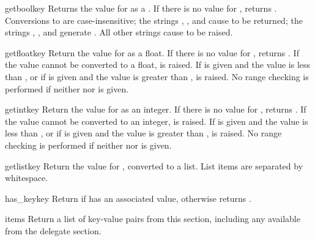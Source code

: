 \documentclass{howto}
\begin{document}
\begin{methoddesc}[Configuration]{getbool}{key}
  Returns the value for  as a .  If there is no
  value for , returns .  Conversions to
   are case-insensitive; the strings ,
  , and  cause  to be returned; the
  strings , , and  generate
  .  All other strings cause  to be
  raised.
\end{methoddesc}

\begin{methoddesc}[Configuration]{getfloat}{key}
  Return the value for  as a float.  If there is no
  value for , returns .  If the value cannot
  be converted to a float,  is raised.  If
   is given and the value is less than , or if
   is given and the value is greater than ,
   is raised.  No range checking is performed if
  neither  nor  is given.
\end{methoddesc}

\begin{methoddesc}[Configuration]{getint}{key}
  Return the value for  as an integer.  If there is no
  value for , returns .  If the value cannot
  be converted to an integer,  is raised.  If
   is given and the value is less than , or if
   is given and the value is greater than ,
   is raised.  No range checking is performed if
  neither  nor  is given.
\end{methoddesc}

\begin{methoddesc}[Configuration]{getlist}{key}
  Return the value for , converted to a list.  List items are
  separated by whitespace.
\end{methoddesc}

\begin{methoddesc}[Configuration]{has_key}{key}
  Return  if  has an associated value, otherwise
  returns .
\end{methoddesc}

\begin{methoddesc}[Configuration]{items}{}
  Return a list of key-value pairs from this section, including any
  available from the delegate section.
\end{methoddesc}
\end{document}
